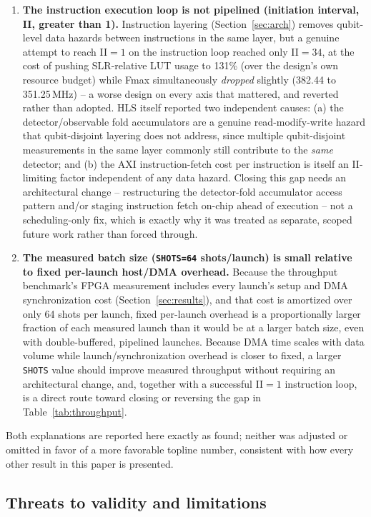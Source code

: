 \documentclass[pdflatex,sn-basic]{sn-jnl}
\begin{document}
\begin{enumerate}
\item \textbf{The instruction execution loop is not pipelined (initiation interval, II, greater than 1).} Instruction layering (Section~\ref{sec:arch}) removes qubit-level data hazards between instructions in the same layer, but a genuine attempt to reach II$=1$ on the instruction loop reached only II$=34$, at the cost of pushing SLR-relative LUT usage to 131\% (over the design's own resource budget) while Fmax simultaneously \emph{dropped} slightly (382.44 to 351.25\,MHz) -- a worse design on every axis that mattered, and reverted rather than adopted. HLS itself reported two independent causes: (a) the detector/observable fold accumulators are a genuine read-modify-write hazard that qubit-disjoint layering does not address, since multiple qubit-disjoint measurements in the same layer commonly still contribute to the \emph{same} detector; and (b) the AXI instruction-fetch cost per instruction is itself an II-limiting factor independent of any data hazard. Closing this gap needs an architectural change -- restructuring the detector-fold accumulator access pattern and/or staging instruction fetch on-chip ahead of execution -- not a scheduling-only fix, which is exactly why it was treated as separate, scoped future work rather than forced through.
\item \textbf{The measured batch size (\texttt{SHOTS=64} shots/launch) is small relative to fixed per-launch host/DMA overhead.} Because the throughput benchmark's FPGA measurement includes every launch's setup and DMA synchronization cost (Section~\ref{sec:results}), and that cost is amortized over only 64 shots per launch, fixed per-launch overhead is a proportionally larger fraction of each measured launch than it would be at a larger batch size, even with double-buffered, pipelined launches. Because DMA time scales with data volume while launch/synchronization overhead is closer to fixed, a larger \texttt{SHOTS} value should improve measured throughput without requiring an architectural change, and, together with a successful II$=1$ instruction loop, is a direct route toward closing or reversing the gap in Table~\ref{tab:throughput}.
\end{enumerate}

Both explanations are reported here exactly as found; neither was adjusted or omitted in favor of a more favorable topline number, consistent with how every other result in this paper is presented.

\subsection{Threats to validity and limitations}
\end{document}
